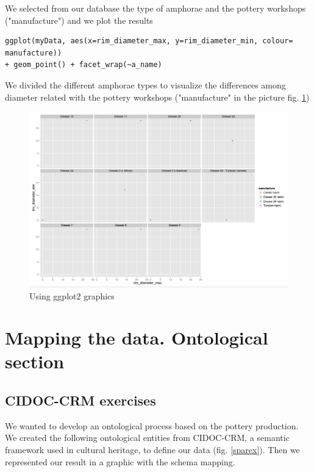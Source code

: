 \documentclass[10pt,a4paper]{article}
\begin{document}
We selected from our database the type of amphorae and the pottery workshops ("manufacture") and we plot the results 

\begin{verbatim}
ggplot(myData, aes(x=rim_diameter_max, y=rim_diameter_min, colour= manufacture)) 
+ geom_point() + facet_wrap(~a_name)
\end{verbatim}

We divided the different amphorae types to visualize the differences among diameter related with the pottery workshops ("manufacture" in the picture fig. \ref{ggplotex})


\begin{figure}[htp]
\centering
\includegraphics[scale=0.40]{ggplot2ex.png}
\caption{Using ggplot2 graphics}
\label{ggplotex}
\end{figure}


\section{Mapping the data. Ontological section}

\subsection{CIDOC-CRM exercises}

We wanted to develop an ontological process based on the pottery production. We created the following ontological entities from CIDOC-CRM, a semantic framework used in cultural heritage, to define our data (fig. \ref{sparex}). Then we represented our result in a graphic with the schema mapping. 
\end{document}
